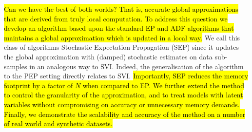 \hl{Can we have the best of both worlds? That is, accurate global approximations that are derived from truly local computation. To address this question we develop an algorithm based upon the standard EP and ADF algorithms that maintains a global approximation which is updated in a local way.}
%
We call this class of algorithms Stochastic Expectation Propagation (SEP) since it updates the global approximation with (damped) stochastic estimates on data sub-samples in an analogous way to SVI. Indeed, the generalisation of the algorithm to the PEP setting directly relates to SVI. 
%
\hl{Importantly, SEP reduces the memory footprint by a factor of $N$ when compared to EP. We further extend the method to control the granularity of the approximation, and to treat models with latent variables without compromising on accuracy or unnecessary memory demands. Finally, we demonstrate the scalability and accuracy of the method on a number of real world and synthetic datasets.}



